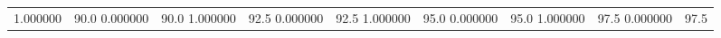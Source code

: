 \begin{table}
\begin{tabular}{llrrrrrr}
1.000000 & 90.0%
0.000000 & 90.0%
1.000000 & 92.5%
0.000000 & 92.5%
1.000000 & 95.0%
0.000000 & 95.0%
1.000000 & 97.5%
0.000000 & 97.5%
\end{tabular}
\end{table}
